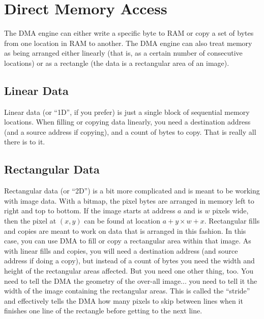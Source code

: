\chapter{Direct Memory Access}

The DMA engine can either write a specific byte to RAM or copy a set of bytes from one location in RAM to another. The DMA engine can also treat memory as being arranged either linearly (that is, as a certain number of consecutive locations) or as a rectangle (the data is a rectangular area of an image).

\section{Linear Data}
Linear data (or ``1D'', if you prefer) is just a single block of sequential memory locations. When filling or copying data linearly, you need a destination address (and a source address if copying), and a count of bytes to copy. That is really all there is to it.

\section{Rectangular Data}
Rectangular data (or ``2D'') is a bit more complicated and is meant to be working with image data. With a bitmap, the pixel bytes are arranged in memory left to right and top to bottom. If the image starts at address $a$ and is $w$ pixels wide, then the pixel at $(x, y)$ can be found at location $a + y \times w + x$. Rectangular fills and copies are meant to work on data that is arranged in this fashion. In this case, you can use DMA to fill or copy a rectangular area within that image. As with linear fills and copies, you will need a destination address (and source address if doing a copy), but instead of a count of bytes you need the width and height of the rectangular areas affected. But you need one other thing, too. You need to tell the DMA the geometry of the over-all image... you need to tell it the width of the image containing the rectangular areas. This is called the ``stride'' and effectively tells the DMA how many pixels to skip between lines when it finishes one line of the rectangle before getting to the next line.

